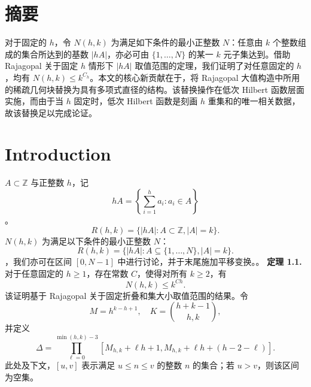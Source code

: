 \documentclass[11pt]{article}
\theoremstyle{break}
\begin{document}
\section{摘要}
对于固定的 $h$，令 $N(h,k)$ 为满足如下条件的最小正整数 $N$：任意由 $k$ 个整数组成的集合所达到的基数 $|hA|$，亦必可由 $\{1,\dots,N\}$ 的某一 $k$ 元子集达到。借助 Rajagopal 关于固定 $h$ 情形下 $|hA|$ 取值范围的定理，我们证明了对任意固定的 $h$，均有 $N(h,k) \leq k^{C_h}$。本文的核心新贡献在于，将 Rajagopal 大值构造中所用的稀疏几何块替换为具有多项式直径的结构。该替换操作在低次 Hilbert 函数层面实施，而由于当 $h$ 固定时，低次 Hilbert 函数是刻画 $h$ 重集和的唯一相关数据，故该替换足以完成论证。
\section{Introduction} $A \subset \mathbb{Z}$ 与正整数 $h$，记\[ hA = \left\{ \sum_{i=1}^h a_i : a_i \in A \right\} \]。\[ R(h,k) = \{ |hA| : A \subset \mathbb{Z}, |A| = k \}. \] $N(h,k)$ 为满足以下条件的最小正整数 $N$：\[ R(h,k) = \{ |hA| : A \subseteq \{1,\dots,N\}, |A| = k \}. \]，我们亦可在区间 $[0, N-1]$ 中进行讨论，并于末尾施加平移变换。。
\textbf{定理 1.1.} 对于任意固定的 $h \geq 1$，存在常数 $C$，使得对所有 $k \geq 2$，有
\[
N(h,k) \leq k^{Ch}.
\]
该证明基于 Rajagopal 关于固定折叠和集大小取值范围的结果。令
\[
M = h^{k-h+1}, \quad K = \binom{h+k-1}{h,k},
\]
并定义
\[
\Delta = \prod_{\ell=0}^{\min(h,k)-3} [M_{h,k} + \ell h + 1, M_{h,k} + \ell h + (h-2-\ell)].
\]
此处及下文，$[u,v]$ 表示满足 $u \leq n \leq v$ 的整数 $n$ 的集合；若 $u > v$，则该区间为空集。
\end{document}
